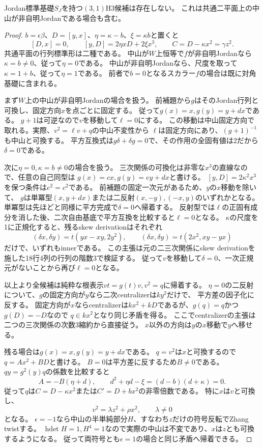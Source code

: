 \begin{theorem}\label{thm:h3-positive3-Jordan-base-exclusion}
Jordan標準基礎$S_J$を持つ$(3,1)$H3候補は存在しない。
これは共通二平面上の中山が非自明Jordanである場合も含む。
\end{theorem}
\begin{proof}
$b=\epsilon\beta$、$D=[y,x]$、$\eta=\kappa-b$、$\xi=\kappa b$と置くと
\[
 [D,x]=0,\qquad [y,D]=2\eta xD+2\xi x^3,\qquad
 C=D-\kappa x^2=\gamma z^2.
\]
共通平面の行列標準形は二種である。
中山が$W$上恒等で$f$が非自明Jordanなら$\kappa=b\ne0$、従って$\eta=0$である。
中山が非自明Jordanなら、尺度を取って$\kappa=1+b$、従って$\eta=1$である。
前者で$b=0$となるスカラー$f$の場合は既に対角基礎に含まれる。

まず$W$上の中山が非自明Jordanの場合を扱う。
前補題から$g$はそのJordan行列と可換し、固定方向$x$を点ごとに固定する。
従って$g(x)=x,g(y)=y+dx$である。
$g+1$は可逆なので$v$を移動して$\ell=0$にする。
この移動は中山固定方向で取れる。実際、$v^2=\ell v+q$の中山不変性から
$\ell$は固定方向にあり、$(g+1)^{-1}$も中山と可換する。
平方互換式は$g\delta+\delta g=0$で、その作用の全固有値は2だから$\delta=0$である。

次に$\eta=0,\kappa=b\ne0$の場合を扱う。
三次関係の可換化は非零な$x^3$の直線なので、任意の自己同型は
$g(x)=cx,g(y)=ey+dx$と書ける。
$[y,D]=2\kappa^2x^3$を保つ条件は$e^2=c^2$である。
前補題の固定一次元があるため、$y$の$x$移動を除いて、
$g$は単冪型$(x,y+dx)$または二反射$(x,-y),(-x,y)$のいずれかとなる。
単冪型は先ほどと同様に平方完成で$\delta=0$へ帰着する。
反射型では$\ell$の正固有成分を消した後、二次自由基底で平方互換を比較すると$\ell=0$となる。
$\kappa$の尺度を1に正規化すると、残るskew derivationはそれぞれ
\[
 (\delta x,\delta y)=t(yx-xy,2y^2),\qquad
 (\delta x,\delta y)=t(2x^2,xy-yx)
\]
だけで、いずれもinnerである。
この主張は元の二三次関係にskew derivationを施した18行4列の行列の階数3で検証する。
従って$v$を移動して$\delta=0$、一次正規元がないことから再び$\ell=0$となる。

以上より全候補は純粋な根表示$vt=g(t)v,v^2=q$に帰着する。
$\eta=0$の二反射について、$g$の固定方向が$y$なら二次centralizerは$ky^2$だけで、
平方差の因子化に反する。
固定方向が$x$ならcentralizerは$kx^2+kD$であるが、$g(q)=q$かつ$g(D)=-D$なので
$q\in kx^2$となり同じ矛盾を得る。
ここでcentralizerの主張は二つの三次関係の次数3縮約から直接従う。
$x$以外の方向は$y$の$x$移動で$y$へ移せる。

残る場合は$g(x)=x,g(y)=y+dx$である。
$q=v^2$は$x$と可換するので$q=A x^2+B D$と書ける。
$B=0$は平方差に反するため$B\ne0$である。
$qy=g^2(y)q$の係数を比較すると
\[
 A=-B(\eta+d),\qquad d^2+\eta d-\xi=(d-b)(d+\kappa)=0.
\]
従って$q$は$C=D-\kappa x^2$または$C'=D+b x^2$の非零倍数である。
特に$x$は$v$と可換し、
\[
 v^2=\lambda z^2+\rho x^2,\qquad\lambda\ne0
\]
となる。
$\epsilon=-1$なら中山の半単純部分$H$、すなわち$z$だけの符号反転でZhang twistする。
$\operatorname{hdet}H=1,H^4=1$なので実際の中山は不変であり、$x$は$z$とも可換するようになる。
従って両符号とも$\epsilon=1$の場合と同じ矛盾へ帰着できる。


\end{proof}
